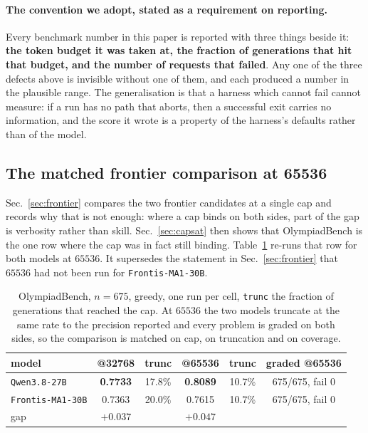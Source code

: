 \paragraph{The convention we adopt, stated as a requirement on reporting.} Every benchmark
number in this paper is reported with three things beside it: \textbf{the token budget it was
taken at, the fraction of generations that hit that budget, and the number of requests that
failed}. Any one of the three defects above is invisible without one of them, and each
produced a number in the plausible range. The generalisation is that a harness which cannot
fail cannot measure: if a run has no path that aborts, then a successful exit carries no
information, and the score it wrote is a property of the harness's defaults rather than of the
model.

\subsection{The matched frontier comparison at 65536}
\label{sec:frontier65k}

Sec.~\ref{sec:frontier} compares the two frontier candidates at a single cap and records why
that is not enough: where a cap binds on both sides, part of the gap is verbosity rather than
skill. Sec.~\ref{sec:capsat} then shows that OlympiadBench is the one row where the cap was
in fact still binding. Table~\ref{tab:frontier65k} re-runs that row for both models at
$65536$. It supersedes the statement in Sec.~\ref{sec:frontier} that $65536$ had not been run
for \texttt{Frontis-MA1-30B}.

\begin{table}[t]
\centering\small
\caption{OlympiadBench, $n=675$, greedy, one run per cell, \texttt{trunc} the fraction of
generations that reached the cap. At $65536$ the two models truncate at the same rate to the
precision reported and every problem is graded on both sides, so the comparison is matched on
cap, on truncation and on coverage.}
\label{tab:frontier65k}
\begin{tabular}{lccccc}
\toprule
model & @32768 & trunc & @65536 & trunc & graded @65536 \\
\midrule
\texttt{Qwen3.8-27B}     & \textbf{0.7733} & 17.8\% & \textbf{0.8089} & 10.7\% & 675/675, fail 0 \\
\texttt{Frontis-MA1-30B} & 0.7363          & 20.0\% & 0.7615          & 10.7\% & 675/675, fail 0 \\
\midrule
gap                      & $+0.037$        &        & $+0.047$        &        & \\
\bottomrule
\end{tabular}
\end{table}

